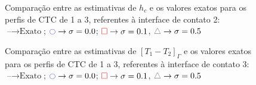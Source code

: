 %
%
\begin{figure}[h!b]
	\caption{Comparação entre as estimativas de $h_c$ e os valores exatos para os perfis de CTC de 1 a 3, referentes à interface de contato 2: $\text{--} \rightarrow \text{Exato}$; $\textcolor{blue}{\ocircle} \rightarrow \sigma = 0.0$; $\textcolor{red}{\square} \rightarrow \sigma = 0.1$, $\textcolor{gray}{\triangle} \rightarrow \sigma = 0.5$}
\end{figure}
%
%
\begin{figure}[h!b]
	\caption{Comparação entre as estimativas de $[T_1 - T_2]_\Gamma$ e os valores exatos para os perfis de CTC de 1 a 3, referentes à interface de contato 3: $\text{--} \rightarrow \text{Exato}$; $\textcolor{blue}{\ocircle} \rightarrow \sigma = 0.0$; $\textcolor{red}{\square} \rightarrow \sigma = 0.1$, $\textcolor{gray}{\triangle} \rightarrow \sigma = 0.5$}
\end{figure}
%
